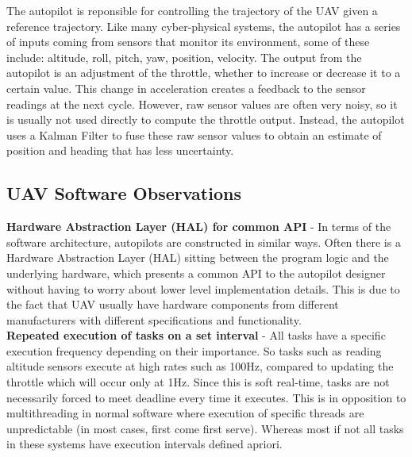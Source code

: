 
The autopilot is reponsible for controlling the trajectory of the UAV
given a reference trajectory. Like many cyber-physical systems,
the autopilot has a series of inputs coming from sensors that monitor
its environment, some of these include: altitude, roll, pitch, yaw, position,
velocity. The output from the autopilot is an adjustment of the throttle, whether to
increase or decrease it to a certain value. This change in
acceleration creates a feedback to the sensor readings at the next
cycle. However, raw sensor values are often very noisy, so it is
usually not used directly to compute the throttle output. Instead, the
autopilot uses a Kalman Filter to fuse these raw sensor values to
obtain an estimate of position and heading that has less uncertainty.



\subsection{UAV Software Observations} \label{observations}

\noindent \textbf{Hardware Abstraction Layer (HAL) for common API} - In
terms of the software architecture, autopilots are constructed in
similar ways. Often there is a Hardware Abstraction Layer (HAL)
sitting between the program logic and the underlying hardware, which
presents a common API to the autopilot designer without having to
worry about lower level implementation details. This is due to the
fact that UAV usually have hardware components from different
manufacturers with different specifications and functionality.
~\\

\noindent \textbf{Repeated execution of tasks on a set interval} - All tasks have
a specific execution frequency depending on their importance. So tasks
such as reading altitude sensors execute at high rates such as 100Hz,
compared to updating the throttle which will occur only at 1Hz. Since
this is soft real-time, tasks are not necessarily forced to meet
deadline every time it executes. This is in opposition to
multithreading in normal software where execution of specific threads
are unpredictable (in most cases, first come first serve). Whereas
most if not all tasks in these systems have execution intervals
defined apriori.
~\\

